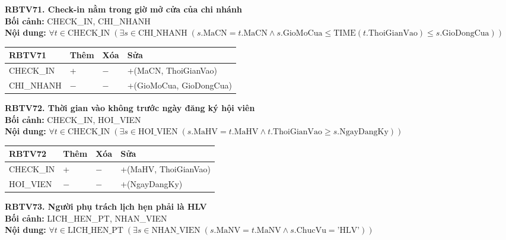 \documentclass[11pt, a4paper]{article}
\begin{document}
\vspace{0.8em}
\textbf{RBTV71. Check-in nằm trong giờ mở cửa của chi nhánh} \\
\textbf{Bối cảnh:} CHECK\_IN, CHI\_NHANH \\
\textbf{Nội dung:} $\forall t \in \text{CHECK\_IN} \; (\exists s \in \text{CHI\_NHANH} \; (s.\text{MaCN} = t.\text{MaCN} \land s.\text{GioMoCua} \le \text{TIME}(t.\text{ThoiGianVao}) \le s.\text{GioDongCua}))$

\vspace{0.3em}
\begin{small}
\begin{tabularx}{\textwidth}{| C{4.2cm} | C{2cm} | C{2cm} | Y |}
\hline
\textbf{RBTV71} & \textbf{Thêm} & \textbf{Xóa} & \textbf{Sửa} \\
\hline
CHECK\_IN & + & $-$ & +(MaCN, ThoiGianVao) \\
\hline
CHI\_NHANH & $-$ & $-$ & +(GioMoCua, GioDongCua) \\
\hline
\end{tabularx}
\end{small}

\vspace{0.8em}
\textbf{RBTV72. Thời gian vào không trước ngày đăng ký hội viên} \\
\textbf{Bối cảnh:} CHECK\_IN, HOI\_VIEN \\
\textbf{Nội dung:} $\forall t \in \text{CHECK\_IN} \; (\exists s \in \text{HOI\_VIEN} \; (s.\text{MaHV} = t.\text{MaHV} \land t.\text{ThoiGianVao} \ge s.\text{NgayDangKy}))$

\vspace{0.3em}
\begin{small}
\begin{tabularx}{\textwidth}{| C{4.2cm} | C{2cm} | C{2cm} | Y |}
\hline
\textbf{RBTV72} & \textbf{Thêm} & \textbf{Xóa} & \textbf{Sửa} \\
\hline
CHECK\_IN & + & $-$ & +(MaHV, ThoiGianVao) \\
\hline
HOI\_VIEN & $-$ & $-$ & +(NgayDangKy) \\
\hline
\end{tabularx}
\end{small}

\vspace{0.8em}
\textbf{RBTV73. Người phụ trách lịch hẹn phải là HLV} \\
\textbf{Bối cảnh:} LICH\_HEN\_PT, NHAN\_VIEN \\
\textbf{Nội dung:} $\forall t \in \text{LICH\_HEN\_PT} \; (\exists s \in \text{NHAN\_VIEN} \; (s.\text{MaNV} = t.\text{MaNV} \land s.\text{ChucVu} = \text{'HLV'}))$
\end{document}
